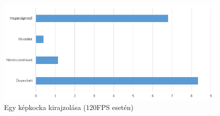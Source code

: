 \begin{figure}[h]
\centering
\includegraphics[scale=0.84]{kepek/frame_draw_diag.png}
\caption{Egy képkocka kirajzolása (120FPS esetén)}
\label{fig:frame_draw}
\end{figure}